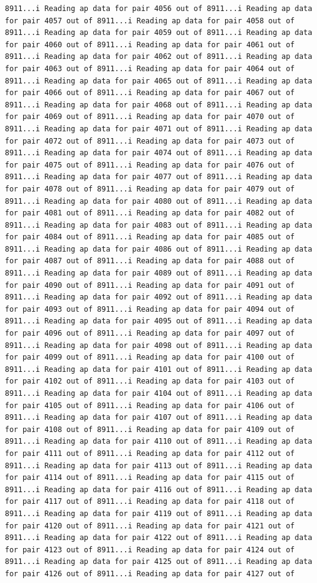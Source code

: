 \documentclass[
]{article}
\begin{document}
\begin{verbatim}
8911...i Reading ap data for pair 4056 out of 8911...i Reading ap data for pair 4057 out of 8911...i Reading ap data for pair 4058 out of 8911...i Reading ap data for pair 4059 out of 8911...i Reading ap data for pair 4060 out of 8911...i Reading ap data for pair 4061 out of 8911...i Reading ap data for pair 4062 out of 8911...i Reading ap data for pair 4063 out of 8911...i Reading ap data for pair 4064 out of 8911...i Reading ap data for pair 4065 out of 8911...i Reading ap data for pair 4066 out of 8911...i Reading ap data for pair 4067 out of 8911...i Reading ap data for pair 4068 out of 8911...i Reading ap data for pair 4069 out of 8911...i Reading ap data for pair 4070 out of 8911...i Reading ap data for pair 4071 out of 8911...i Reading ap data for pair 4072 out of 8911...i Reading ap data for pair 4073 out of 8911...i Reading ap data for pair 4074 out of 8911...i Reading ap data for pair 4075 out of 8911...i Reading ap data for pair 4076 out of 8911...i Reading ap data for pair 4077 out of 8911...i Reading ap data for pair 4078 out of 8911...i Reading ap data for pair 4079 out of 8911...i Reading ap data for pair 4080 out of 8911...i Reading ap data for pair 4081 out of 8911...i Reading ap data for pair 4082 out of 8911...i Reading ap data for pair 4083 out of 8911...i Reading ap data for pair 4084 out of 8911...i Reading ap data for pair 4085 out of 8911...i Reading ap data for pair 4086 out of 8911...i Reading ap data for pair 4087 out of 8911...i Reading ap data for pair 4088 out of 8911...i Reading ap data for pair 4089 out of 8911...i Reading ap data for pair 4090 out of 8911...i Reading ap data for pair 4091 out of 8911...i Reading ap data for pair 4092 out of 8911...i Reading ap data for pair 4093 out of 8911...i Reading ap data for pair 4094 out of 8911...i Reading ap data for pair 4095 out of 8911...i Reading ap data for pair 4096 out of 8911...i Reading ap data for pair 4097 out of 8911...i Reading ap data for pair 4098 out of 8911...i Reading ap data for pair 4099 out of 8911...i Reading ap data for pair 4100 out of 8911...i Reading ap data for pair 4101 out of 8911...i Reading ap data for pair 4102 out of 8911...i Reading ap data for pair 4103 out of 8911...i Reading ap data for pair 4104 out of 8911...i Reading ap data for pair 4105 out of 8911...i Reading ap data for pair 4106 out of 8911...i Reading ap data for pair 4107 out of 8911...i Reading ap data for pair 4108 out of 8911...i Reading ap data for pair 4109 out of 8911...i Reading ap data for pair 4110 out of 8911...i Reading ap data for pair 4111 out of 8911...i Reading ap data for pair 4112 out of 8911...i Reading ap data for pair 4113 out of 8911...i Reading ap data for pair 4114 out of 8911...i Reading ap data for pair 4115 out of 8911...i Reading ap data for pair 4116 out of 8911...i Reading ap data for pair 4117 out of 8911...i Reading ap data for pair 4118 out of 8911...i Reading ap data for pair 4119 out of 8911...i Reading ap data for pair 4120 out of 8911...i Reading ap data for pair 4121 out of 8911...i Reading ap data for pair 4122 out of 8911...i Reading ap data for pair 4123 out of 8911...i Reading ap data for pair 4124 out of 8911...i Reading ap data for pair 4125 out of 8911...i Reading ap data for pair 4126 out of 8911...i Reading ap data for pair 4127 out of 
\end{verbatim}
\end{document}
